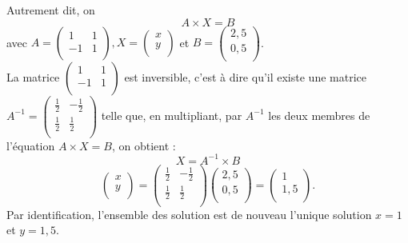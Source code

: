 \documentclass{book}
\begin{document}
\begin{Exemple}
\begin{center}
\end{center}
Autrement dit, on $$A\times X =B$$ avec $A=\begin{pmatrix}
 1 & 1   \\
 -1 & 1  \\
\end{pmatrix}, X=\begin{pmatrix}
 x   \\
 y  \\
\end{pmatrix}$ et $B=\begin{pmatrix}
 2,5   \\
 0,5  \\
\end{pmatrix}$.\\
La matrice  $\begin{pmatrix}
 1 & 1   \\
 -1 & 1  \\
\end{pmatrix}$ est inversible, c'est à dire qu'il existe une matrice $A^{-1}=\begin{pmatrix}
 \frac 1 2 & -\frac 1 2   \\
 \frac 1 2 & \frac 1 2  \\
\end{pmatrix}$  telle que, en multipliant, par $A^{-1}$ les deux membres de l'équation $A\times X =B$, on obtient :
$$ X=A^{-1}\times B$$
$$ \begin{pmatrix}
 x   \\
 y  \\
\end{pmatrix}=\begin{pmatrix}
 \frac 1 2 & -\frac 1 2   \\
 \frac 1 2 & \frac 1 2  \\
\end{pmatrix} \begin{pmatrix}
 2,5   \\
 0,5  \\
\end{pmatrix}= \begin{pmatrix}
 1  \\
 1,5  \\
\end{pmatrix}.$$ 
Par identification, l'ensemble des solution est de nouveau l'unique solution $x=1$ et $y=1,5$. 
\end{Exemple}
\end{document}

